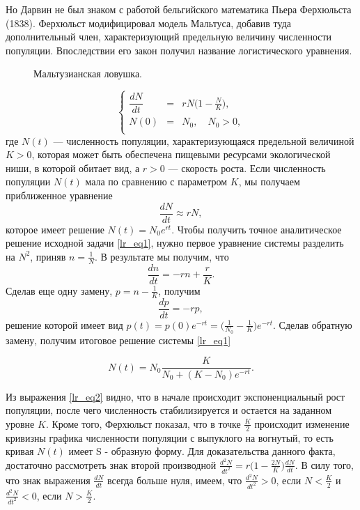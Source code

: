 Но Дарвин не был знаком с работой бельгийского математика Пьера Ферхюльста \cite{Verhlust} (1838). Ферхюльст модифицировал модель Мальтуса, добавив туда дополнительный член, характеризующий предельную величину численности популяции. Впоследствии его закон получил название логистического уравнения.

\begin{figure}[ht]
\caption{Мальтузианская ловушка.}
\label{lr_fig2}
\end{figure}

\begin{equation}
\left\{
\begin{array}{rcl}
\dfrac{dN}{dt} &=& rN \Big(1 - \frac{N}{K}\Big), \\
N(0) &=& N_{0}, \quad N_{0} > 0, \\
\end{array}
\right.
\label{lr_eq1}
\end{equation}
где $N(t)$ --- численность популяции, характеризующаяся предельной величиной $K > 0$, которая может быть обеспечена пищевыми ресурсами экологической ниши, в которой обитает вид, а $r > 0$ --- скорость роста. Если численность популяции $N(t)$ мала по сравнению с параметром $K$, мы получаем приближенное уравнение
$$
\frac{dN}{dt} \approx rN,
$$
которое имеет решение $N(t) = N_{0}e^{rt}$. Чтобы получить точное аналитическое решение исходной задачи \eqref{lr_eq1}, нужно первое уравнение системы разделить на $N^{2}$, приняв $n = \frac{1}{N}$. В результате мы получим, что
$$
\frac{dn}{dt} = -rn + \frac{r}{K}.
$$
Сделав еще одну замену, $p = n - \frac{1}{K}$, получим
$$
\frac{dp}{dt} = -rp,
$$
решение которой имеет вид $p(t) = p(0)e^{-rt} = \Big(\frac{1}{N_{0}} - \frac{1}{K}\Big)e^{-rt}$. Сделав обратную замену, получим итоговое решение системы \eqref{lr_eq1}

\begin{equation}
N(t) = N_{0} \frac{K}{N_{0} + (K - N_{0})e^{-rt}}.
\label{lr_eq2}
\end{equation}

Из выражения \eqref{lr_eq2} видно, что в начале происходит экспоненциальный рост популяции, после чего численность стабилизируется и остается на заданном уровне $K$. Кроме того, Ферхюльст показал, что в точке $\frac{K}{2}$ происходит изменение кривизны графика численности популяции с выпуклого на вогнутый, то есть кривая $N(t)$ имеет S - образную форму. Для доказательства данного факта, достаточно рассмотреть знак второй производной $\frac{d^{2}N}{dt^{2}} = r\Big(1 - \frac{2N}{K}\Big)\frac{dN}{dt}$. В силу того, что знак выражения $\frac{dN}{dt}$ всегда больше нуля, имеем, что $\frac{d^{2}N}{dt^{2}} > 0$, если $N < \frac{K}{2}$ и $\frac{d^{2}N}{dt^{2}} < 0$, если $N > \frac{K}{2}$.

